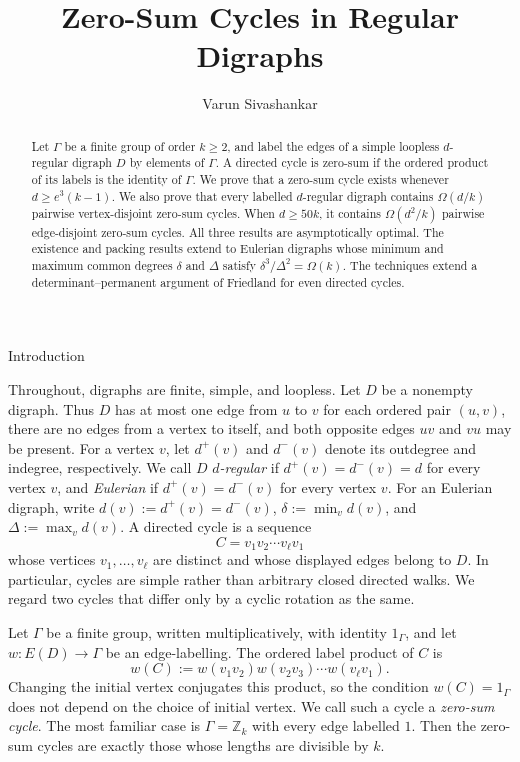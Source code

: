 \documentclass[11pt]{amsart}
\title{Zero-Sum Cycles in Regular Digraphs}
\author{Varun Sivashankar}
\date{}
\makeatletter
\def\section{\@startsection{section}{1}%
  \z@{1.5\linespacing\@plus.6\linespacing}{.65\linespacing}%
  {\normalfont\Large\bfseries\raggedright}}
\theoremstyle{remark}
\makeatother
\begin{document}
\begin{abstract}
Let $\Gamma$ be a finite group of order $k\ge2$, and label the edges of a simple loopless $d$-regular digraph $D$ by elements of $\Gamma$. A directed cycle is zero-sum if the ordered product of its labels is the identity of $\Gamma$. We prove that a zero-sum cycle exists whenever $d\ge e^3(k-1)$. We also prove that every labelled $d$-regular digraph contains $\Omega(d/k)$ pairwise vertex-disjoint zero-sum cycles. When $d\ge50k$, it contains $\Omega(d^2/k)$ pairwise edge-disjoint zero-sum cycles. All three results are asymptotically optimal. The existence and packing results extend to Eulerian digraphs whose minimum and maximum common degrees $\delta$ and $\Delta$ satisfy $\delta^3/\Delta^2=\Omega(k)$. The techniques extend a determinant--permanent argument of Friedland for even directed cycles.
\end{abstract}

\maketitle

\section{Introduction}

Throughout, digraphs are finite, simple, and loopless.  Let $D$ be a
nonempty digraph.  Thus $D$ has at most one edge from $u$ to $v$ for
each ordered pair $(u,v)$, there are no edges from a vertex to itself,
and both opposite edges $uv$ and
$vu$ may be present.  For a vertex $v$, let $d^+(v)$ and $d^-(v)$ denote
its outdegree and indegree, respectively.  We call $D$ \emph{$d$-regular}
if $d^+(v)=d^-(v)=d$ for every vertex $v$, and \emph{Eulerian} if
$d^+(v)=d^-(v)$ for every vertex $v$.  For an Eulerian digraph, write
$d(v):=d^+(v)=d^-(v)$, $\delta:=\min_v d(v)$, and
$\Delta:=\max_v d(v)$.  A directed cycle is a sequence
\[
  C=v_1v_2\cdots v_\ell v_1
\]
whose vertices $v_1,\ldots,v_\ell$ are distinct and whose displayed
edges belong to $D$.  In particular, cycles are simple rather than
arbitrary closed directed walks.  We regard two cycles that differ only
by a cyclic rotation as the same.

Let $\Gamma$ be a finite group, written multiplicatively, with identity
$1_\Gamma$, and let $w:E(D)\to\Gamma$ be an edge-labelling.  The ordered
label product of $C$ is
\[
  w(C):=w(v_1v_2)w(v_2v_3)\cdots w(v_\ell v_1).
\]
Changing the initial vertex conjugates this product, so the condition
$w(C)=1_\Gamma$ does not depend on the choice of initial vertex.  We call
such a cycle a \emph{zero-sum cycle}.  The most familiar case is
$\Gamma=\mathbb Z_k$ with every edge labelled $1$.  Then the zero-sum
cycles are exactly those whose lengths are divisible by $k$.
\end{document}
